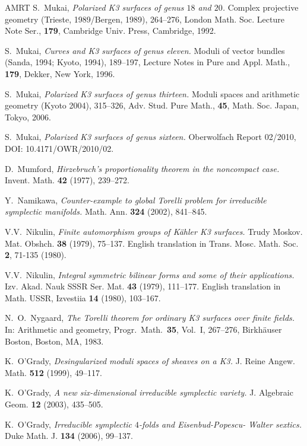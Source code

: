 \documentclass[a4paper,11pt]{article}
\begin{document}
\begin{thebibliography}{AMRT}
 S.~Mukai, {\it Polarized K3 surfaces of genus $18$
  and $20$.} Complex projective geometry (Trieste, 1989/Bergen, 1989),
  264--276, London Math. Soc. Lecture Note Ser., {\bf 179}, Cambridge
  Univ. Press, Cambridge, 1992.

 S.~Mukai, {\it Curves and K3 surfaces of genus
  eleven.} Moduli of vector bundles (Sanda, 1994; Kyoto, 1994),
  189--197, Lecture Notes in Pure and Appl. Math., {\bf 179}, Dekker,
  New York, 1996.

 S.~Mukai, {\it Polarized K3 surfaces of genus
  thirteen.}  Moduli spaces and arithmetic geometry (Kyoto 2004),
  315--326, Adv. Stud. Pure Math., {\bf 45}, Math. Soc. Japan, Tokyo,
  2006.

 S.~Mukai, {\it Polarized K3 surfaces of genus
  sixteen.}  Oberwolfach Report 02/2010, DOI: 10.4171/OWR/2010/02.

 D.~Mumford, {\it Hirzebruch's proportionality
  theorem in the noncompact case.} Invent. Math. {\bf 42} (1977),
  239--272.

 Y.~Namikawa, {\it Counter-example to global Torelli
  problem for irreducible symplectic manifolds.}  Math. Ann. {\bf 324}
  (2002), 841--845.

 V.V.~Nikulin, {\it Finite automorphism groups of
   K\"ahler K3 surfaces.} Trudy Moskov. Mat. Obshch. {\bf 38}
  (1979), 75--137. English translation in Trans. Mosc. Math. Soc. {\bf
    2}, 71-135 (1980).

 V.V.~Nikulin, {\it Integral symmetric bilinear
    forms and some of their applications.}  Izv. Akad. Nauk SSSR Ser.
  Mat. {\bf 43} (1979), 111--177.  English translation in Math. USSR,
  Izvestiia {\bf 14} (1980), 103--167.

 N.~O.~Nygaard, {\it The Torelli theorem for ordinary
  K3 surfaces over finite fields.}  In: Arithmetic and geometry,
  Progr.~Math.~{\bf 35}, Vol.~I, 267--276, Birkh\"auser Boston,
  Boston, MA, 1983.

 K.~O'Grady, {\it Desingularized moduli spaces of
  sheaves on a K3.} J. Reine Angew. Math. {\bf 512} (1999),
  49--117.

 K.~O'Grady, {\it A new six-dimensional irreducible
  symplectic variety.} J. Algebraic Geom. {\bf 12} (2003), 435--505.

 K.~O'Grady, {\it Irreducible symplectic $4$-folds
  and Eisenbud-Popescu- Walter sextics.} Duke Math. J. {\bf 134}
  (2006), 99--137.


\end{thebibliography}
\end{document}
